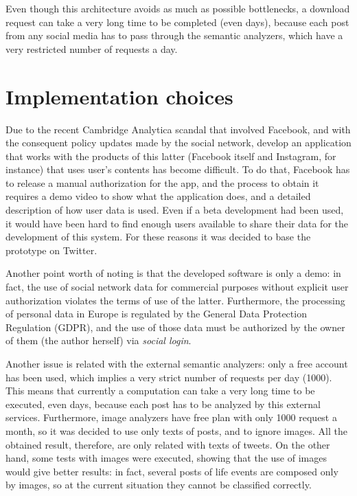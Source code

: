 Even though this architecture avoids as much as possible bottlenecks, a download request can take a very long time to be completed (even days), because each post from any social media has to pass through the semantic analyzers, which have a very restricted number of requests a day.

\section{Implementation choices}
\label{sec:choices}
Due to the recent Cambridge Analytica scandal that involved Facebook, and with the consequent policy updates made by the social network, develop an application that works with the products of this latter (Facebook itself and Instagram, for instance) that uses user's contents has become difficult. To do that, Facebook has to release a manual authorization for the app, and the process to obtain it requires a demo video to show what the application does, and a detailed description of how user data is used. Even if a beta development had been used, it would have been hard to find enough users available to share their data for the development of this system. For these reasons it was decided to base the prototype on Twitter.

Another point worth of noting is that the developed software is only a demo: in fact, the use of social network data for commercial purposes without explicit user authorization violates the terms of use of the latter. Furthermore, the processing of personal data in Europe is regulated by the General Data Protection Regulation (GDPR), and the use of those data must be authorized by the owner of them (the author herself) via \emph{social login}.

Another issue is related with the external semantic analyzers: only a free account has been used, which implies a very strict number of requests per day (1000). This means that currently a computation can take a very long time to be executed, even days, because each post has to be analyzed by this external services. Furthermore, image analyzers have free plan with only 1000 request a month, so it was decided to use only texts of posts, and to ignore images. All the obtained result, therefore, are only related with texts of tweets. On the other hand, some tests with images were executed, showing that the use of images would give better results: in fact, several posts of life events are composed only by images, so at the current situation they cannot be classified correctly.

